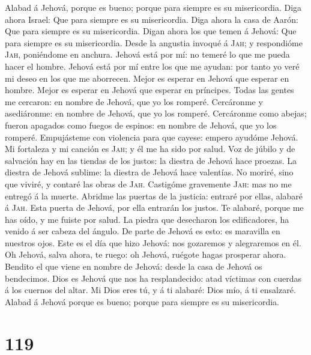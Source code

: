  Alabad á Jehová, porque es bueno; porque para siempre es
su misericordia.  Diga ahora Israel: Que para siempre es
su misericordia.  Diga ahora la casa de Aarón: Que para
siempre es su misericordia.  Digan ahora los que temen á
Jehová: Que para siempre es su misericordia.  Desde la
angustia invoqué á \textsc{Jah}; y respondióme \textsc{Jah}, poniéndome
en anchura.  Jehová está por mí: no temeré lo que me pueda
hacer el hombre.  Jehová está por mí entre los que me
ayudan: por tanto yo veré mi deseo en los que me aborrecen.
 Mejor es esperar en Jehová que esperar en hombre.
 Mejor es esperar en Jehová que esperar en príncipes.
 Todas las gentes me cercaron: en nombre de Jehová, que
yo los romperé.  Cercáronme y asediáronme: en nombre de
Jehová, que yo los romperé.  Cercáronme como abejas;
fueron apagados como fuegos de espinos: en nombre de Jehová, que yo los
romperé.  Empujásteme con violencia para que cayese:
empero ayudóme Jehová.  Mi fortaleza y mi canción es
\textsc{Jah}; y él me ha sido por salud.  Voz de júbilo y
de salvación hay en las tiendas de los justos: la diestra de Jehová hace
proezas.  La diestra de Jehová sublime: la diestra de
Jehová hace valentías.  No moriré, sino que viviré, y
contaré las obras de \textsc{Jah}.  Castigóme gravemente
\textsc{Jah}: mas no me entregó á la muerte.  Abridme las
puertas de la justicia: entraré por ellas, alabaré á \textsc{Jah}.
 Esta puerta de Jehová, por ella entrarán los justos.
 Te alabaré, porque me has oído, y me fuiste por salud.
 La piedra que desecharon los edificadores, ha venido á
ser cabeza del ángulo.  De parte de Jehová es esto: es
maravilla en nuestros ojos.  Este es el día que hizo
Jehová: nos gozaremos y alegraremos en él.  Oh Jehová,
salva ahora, te ruego: oh Jehová, ruégote hagas prosperar ahora.
 Bendito el que viene en nombre de Jehová: desde la casa
de Jehová os bendecimos.  Dios es Jehová que nos ha
resplandecido: atad víctimas con cuerdas á los cuernos del altar.
 Mi Dios eres tú, y á ti alabaré: Dios mío, á ti
ensalzaré.  Alabad á Jehová porque es bueno; porque para
siempre es su misericordia.

\hypertarget{section-118}{%
\section{119}\label{section-118}}

